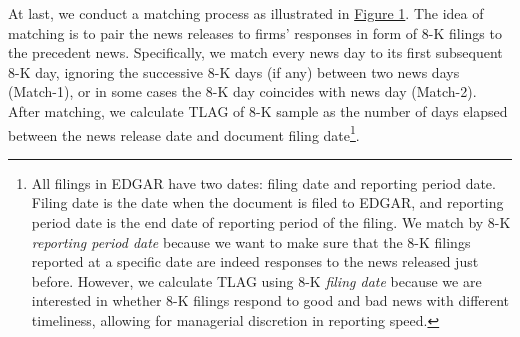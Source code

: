 \documentclass[a4paper]{article}
\begin{document}
\begin{spacing}{2}
At last, we conduct a matching process as illustrated in \hyperref[fig1]{Figure 1}. The idea of matching is to pair the news releases to firms' responses in form of 8-K filings to the precedent news. Specifically, we match every news day to its first subsequent 8-K day, ignoring the successive 8-K days (if any) between two news days (Match-1), or in some cases the 8-K day coincides with news day (Match-2). After matching, we calculate TLAG of 8-K sample as the number of days elapsed between the news release date and document filing date\footnote{All filings in EDGAR have two dates: filing date and reporting period date. Filing date is the date when the document is filed to EDGAR, and reporting period date is the end date of reporting period of the filing. We match by 8-K \textit{reporting period date} because we want to make sure that the 8-K filings reported at a specific date are indeed responses to the news released just before. However, we calculate TLAG using 8-K \textit{filing date} because we are interested in whether 8-K filings respond to good and bad news with different timeliness, allowing for managerial discretion in reporting speed.}. 


\end{spacing}
\end{document}
